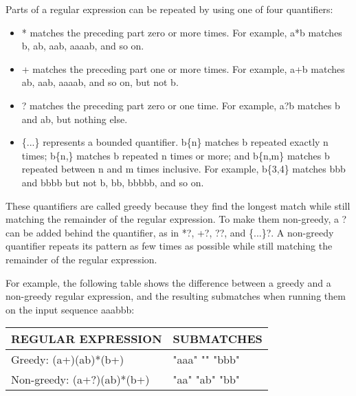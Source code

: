 
Parts of a regular expression can be repeated by using one of four quantifiers:

\begin{itemize}
\item
* matches the preceding part zero or more times. For example, a*b matches b, ab, aab, aaaab, and so on.

\item
+ matches the preceding part one or more times. For example, a+b matches ab, aab, aaaab, and so on, but not b.

\item
? matches the preceding part zero or one time. For example, a?b matches b and ab, but nothing else.

\item
\{...\} represents a bounded quantifier. b\{n\} matches b repeated exactly n times; b\{n,\} matches b repeated n times or more; and b\{n,m\} matches b repeated between n and m times inclusive. For example, b\{3,4\} matches bbb and bbbb but not b, bb, bbbbb, and so on.
\end{itemize}

These quantifiers are called greedy because they find the longest match while still matching the remainder of the regular expression. To make them non-greedy, a ? can be added behind the quantifier, as in *?, +?, ??, and \{...\}?. A non-greedy quantifier repeats its pattern as few times as possible while still matching the remainder of the regular expression.

For example, the following table shows the difference between a greedy and a non-greedy regular expression, and the resulting submatches when running them on the input sequence aaabbb:

\begin{longtable}{|l|l|}
\hline
\textbf{REGULAR EXPRESSION} & \textbf{SUBMATCHES} \\ \hline
\endfirsthead
%
\endhead
%
Greedy: (a+)(ab)*(b+)       & "aaa" "" "bbb"      \\ \hline
Non-greedy: (a+?)(ab)*(b+)  & "aa" "ab" "bb"      \\ \hline
\end{longtable}


